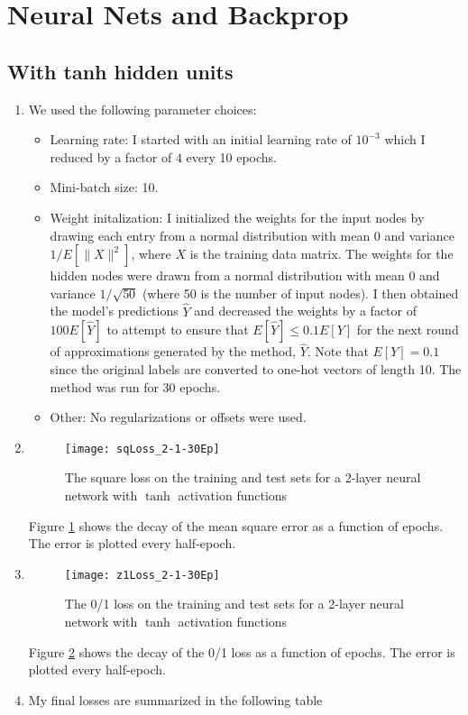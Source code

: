 \documentclass{article}
\begin{document}
\section{Neural Nets and Backprop}
\subsection{With tanh hidden units}
\begin{enumerate}
    \item We used the following parameter choices:
    \begin{itemize}
        \item Learning rate: I started with an initial learning rate of $10^{-3}$ which I reduced by a factor of $4$ every 10 epochs.
        \item Mini-batch size: 10.
        \item Weight initalization: I initialized the weights for the input nodes by drawing each entry from a normal distribution with mean 0 and variance $1/E[\|X\|^2]$, where $X$ is the training data matrix. The weights for the hidden nodes were drawn from a normal distribution with mean 0 and variance $1/\sqrt{50}$ (where 50 is the number of input nodes). I then obtained the model's predictions $\hat Y$ and decreased the weights by a factor of $100E[\hat Y]$ to attempt to ensure that $E[\hat Y]\leq 0.1E[Y]$ for the next round of approximations generated by the method, $\hat Y$. Note that $E[Y]=0.1$ since the original labels are converted to one-hot vectors of length 10. The method was run for 30 epochs.
        \item Other: No regularizations or offsets were used.
        
    \end{itemize}
    \item
    \begin{figure}
        \centering
        \texttt{[image: sqLoss\_2-1-30Ep]}
        \caption{The square loss on the training and test sets for a 2-layer neural network with $\tanh$ activation functions} 
        \label{fig:sqLoss_2-1}
    \end{figure}
    Figure \ref{fig:sqLoss_2-1} shows the decay of the mean square error as a function of epochs. The error is plotted every half-epoch.
    \item
    \begin{figure}
        \centering
        \texttt{[image: z1Loss\_2-1-30Ep]}
        \caption{The 0/1 loss on the training and test sets for a 2-layer neural network with $\tanh$ activation functions} 
        \label{fig:z1Loss_2-1}
    \end{figure}
    Figure \ref{fig:z1Loss_2-1} shows the decay of the 0/1 loss as a function of epochs. The error is plotted every half-epoch.
    \item My final losses are summarized in the following table


\end{enumerate}
\end{document}
